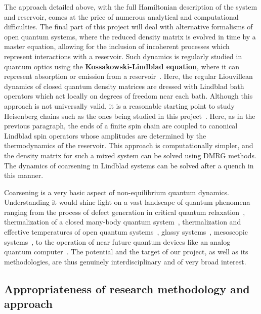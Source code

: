 \documentclass[a4paper,11pt,color]{article}
\begin{document}
The approach detailed above, with the full Hamiltonian description of the system and reservoir, comes at the price of numerous analytical and computational difficulties. The final part of this project will deal with alternative formalisms of open quantum systems, where the reduced density matrix is evolved in time by a master equation, allowing for the inclusion of incoherent processes which represent interactions with a reservoir. Such dynamics is regularly studied in quantum optics using the \textbf{Kossakowski-Lindblad equation}, where it can represent absorption or emission from a reservoir~\cite{lindblad}. Here, the regular Liouvillean dynamics of closed quantum density matrices are dressed with Lindblad bath operators which act locally on degrees of freedom near each bath. Although this approach is not universally valid, it is a reasonable starting point to study Heisenberg chains such as the ones being studied in this project~\cite{spinchains:lindblad}. Here, as in the previous paragraph, the ends of 
a finite spin chain are coupled to canonical Lindblad spin operators whose amplitudes are determined by the thermodynamics of the reservoir.  This approach is computationally simpler, and the density matrix for such a mixed system can be solved using DMRG methods. The dynamics of coarsening in Lindblad systems can be solved after a quench in this manner.

Coarsening is a very basic aspect of non-equilibrium quantum dynamics. Understanding it would shine light on a vast landscape of quantum phenomena ranging from the process of defect generation in critical quantum relaxation~\cite{relaxation}, thermalization of a closed many-body quantum system~\cite{krishrev, thermalization}, thermalization and effective temperatures of open quantum systems~\cite{thermopen}, glassy systems~\cite{glassy}, mesoscopic systems~\cite{meso}, to the operation of near future quantum devices like an analog quantum computer~\cite{annealing}. The potential and the target of our project, as well as its methodologies, are thus genuinely interdisciplinary and of very broad interest.
 
\subsection{Appropriateness of research methodology and approach}
\label{sec:research_methodology}
\end{document}
